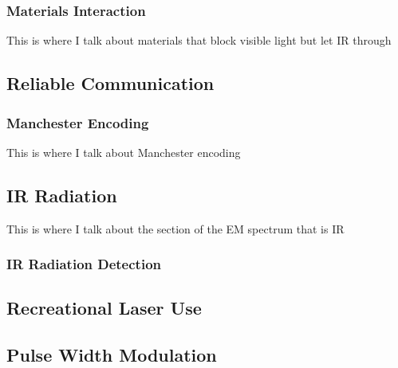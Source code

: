 \subsubsection{Materials Interaction}
This is where I talk about materials that block visible light but let IR through


\subsection{Reliable Communication}

\subsubsection{Manchester Encoding}
This is where I talk about Manchester encoding



\subsection{IR Radiation}
This is where I talk about the section of the EM spectrum that is IR


\subsubsection{IR Radiation Detection}





\subsection{Recreational Laser Use}



\subsection{Pulse Width Modulation}







